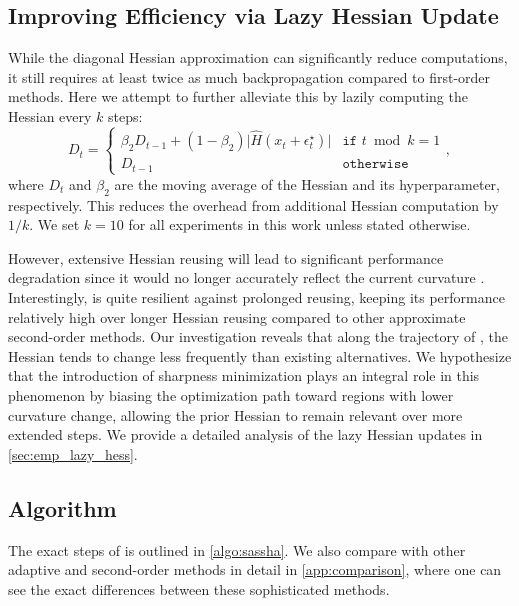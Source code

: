 \subsection{Improving Efficiency via Lazy Hessian Update} \label{sec:lazy_hessian}
While the diagonal Hessian approximation can significantly reduce computations, it still requires at least twice as much backpropagation compared to first-order methods.
Here we attempt to further alleviate this by lazily computing the Hessian every $k$ steps:
{\small
\begin{equation*}\label{eq:lazy_update}
    D_t = \begin{cases}
    \beta_2 D_{t-1} + (1-\beta_2) \lvert \widehat{H} (x_t+\epsilon^\star_t) \rvert & \texttt{if } t \  \operatorname{mod} \  k = 1 \\ 
    D_{t-1} & \texttt{otherwise} 
    \end{cases},
\end{equation*}
}
where $D_t$ and $\beta_2$ are the moving average of the Hessian and its hyperparameter, respectively.
This reduces the overhead from additional Hessian computation by $1/k$.
We set $k=10$ for all experiments in this work unless stated otherwise.

However, extensive Hessian reusing will lead to significant performance degradation since it would no longer accurately reflect the current curvature \citep{lazyhessian}. 
Interestingly, \sassha is quite resilient against prolonged reusing, keeping its performance relatively high over longer Hessian reusing compared to other approximate second-order methods.
Our investigation reveals that along the trajectory of \sassha, the Hessian tends to change less frequently than existing alternatives.
We hypothesize that the introduction of sharpness minimization plays an integral role in this phenomenon by biasing the optimization path toward regions with lower curvature change, allowing the prior Hessian to remain relevant over more extended steps. 
We provide a detailed analysis of the lazy Hessian updates in \cref{sec:emp_lazy_hess}.

\subsection{Algorithm}
The exact steps of \sassha is outlined in \cref{algo:sassha}.
We also compare \sassha with other adaptive and second-order methods in detail in \cref{app:comparison}, where one can see the exact differences between these sophisticated methods.

